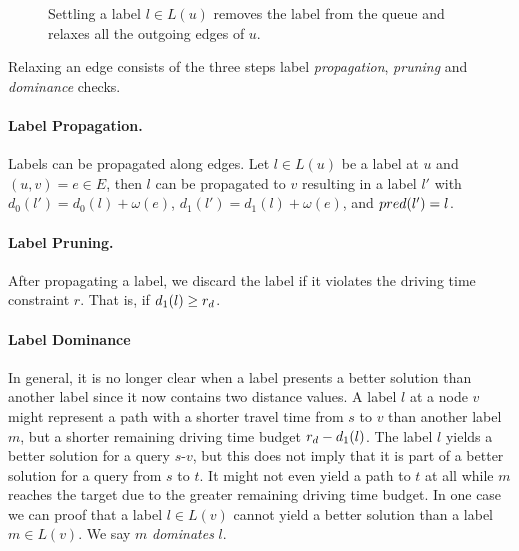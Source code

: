 \begin{figure}[hbtp]
	\setlength{\interspacetitleruled}{0pt}%
	\setlength{\algotitleheightrule}{0pt}%
	\begin{algorithm*}[H]
		\DontPrintSemicolon


	\end{algorithm*}
	\setlength{\interspacetitleruled}{2pt}%
	\setlength{\algotitleheightrule}{\algotitleheightruledefault}%

	\caption{\label{alg:settle_next_label}Settling a label $l \in L(u)$ removes the label from the queue and relaxes all the outgoing edges of $u$.}
\end{figure}

Relaxing an edge consists of the three steps label \emph{propagation}, \emph{pruning} and \emph{dominance} checks.

\paragraph{Label Propagation.}
Labels can be propagated along edges. Let $l \in L(u)$ be a label at $u$ and $(u,v) = e \in E$, then $l$ can be propagated to $v$ resulting in a label $l'$ with $d_0(l') = d_0(l) + \omega(e)$, $d_1(l') = d_1(l) + \omega(e)$, and $pred(l') = l$.

\paragraph{Label Pruning.}
After propagating a label, we discard the label if it violates the driving time constraint $r$. That is, if $d_1(l) \ge r_d$.


\paragraph{Label Dominance}
In general, it is no longer clear when a label presents a better solution than another label since it now contains two distance values. A label $l$ at a node $v$ might represent a path with a shorter travel time from $s$ to $v$ than another label $m$, but a shorter remaining driving time budget $r_d - d_1(l)$. The label $l$ yields a better solution for a query $s$-$v$, but this does not imply that it is part of a better solution for a query from $s$ to $t$. It might not even yield a path to $t$ at all while $m$ reaches the target due to the greater remaining driving time budget. In one case we can proof that a label $l \in L(v)$ cannot yield a better solution than a label $m \in L(v)$. We say $m$ \emph{dominates} $l$.

